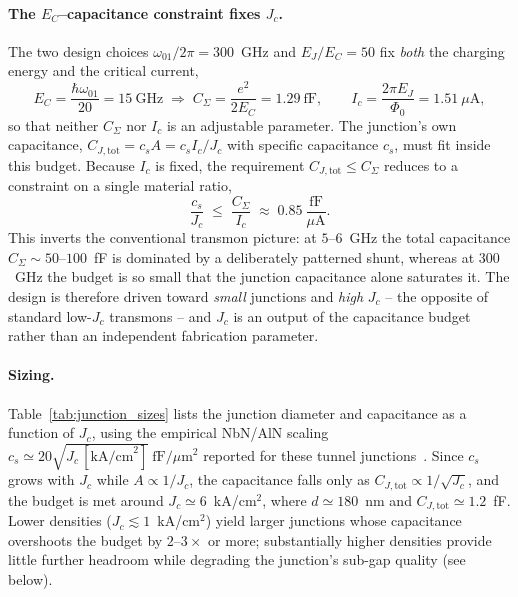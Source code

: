 \paragraph{The $E_C$--capacitance constraint fixes $J_c$.}
The two design choices $\omega_{01}/2\pi = 300$~GHz and $E_J/E_C = 50$ fix \emph{both} the charging energy and the critical current,
\begin{equation}
E_C = \frac{\hbar\omega_{01}}{20} = 15~\text{GHz} \;\Rightarrow\; C_{\Sigma}=\frac{e^2}{2E_C}=1.29~\text{fF},
\qquad
I_c = \frac{2\pi E_J}{\Phi_0}=1.51~\mu\text{A},
\end{equation}
so that neither $C_{\Sigma}$ nor $I_c$ is an adjustable parameter. The junction's own capacitance, $C_{J,\text{tot}}=c_s A = c_s I_c/J_c$ with specific capacitance $c_s$, must fit inside this budget. Because $I_c$ is fixed, the requirement $C_{J,\text{tot}}\le C_{\Sigma}$ reduces to a constraint on a single material ratio,
\begin{equation}
\frac{c_s}{J_c} \;\le\; \frac{C_{\Sigma}}{I_c} \;\approx\; 0.85~\frac{\text{fF}}{\mu\text{A}} .
\label{eq:cs_jc_constraint}
\end{equation}
This inverts the conventional transmon picture: at $5$--$6$~GHz the total capacitance $C_{\Sigma}\sim 50$--$100$~fF is dominated by a deliberately patterned shunt, whereas at $300$~GHz the budget is so small that the junction capacitance alone saturates it. The design is therefore driven toward \emph{small} junctions and \emph{high} $J_c$ -- the opposite of standard low-$J_c$ transmons -- and $J_c$ is an output of the capacitance budget rather than an independent fabrication parameter.

\paragraph{Sizing.}
Table~\ref{tab:junction_sizes} lists the junction diameter and capacitance as a function of $J_c$, using the empirical NbN/AlN scaling $c_s\simeq 20\sqrt{J_c\,[\text{kA/cm}^2]}~\text{fF}/\mu\text{m}^2$ reported for these tunnel junctions~\cite{Wang1994HighJcNbN}. Since $c_s$ grows with $J_c$ while $A\propto 1/J_c$, the capacitance falls only as $C_{J,\text{tot}}\propto 1/\sqrt{J_c}$, and the budget is met around $J_c\simeq 6$~kA/cm$^2$, where $d\simeq 180$~nm and $C_{J,\text{tot}}\simeq 1.2$~fF. Lower densities ($J_c\lesssim 1$~kA/cm$^2$) yield larger junctions whose capacitance overshoots the budget by $2$--$3\times$ or more; substantially higher densities provide little further headroom while degrading the junction's sub-gap quality (see below).

